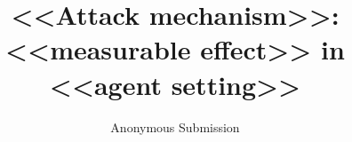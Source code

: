 \documentclass[10pt]{article}
\newif\ifanon \anontrue
\begin{document}
\title{<<Attack mechanism>>: <<measurable effect>> in <<agent setting>>}
\ifanon\author{Anonymous Submission}\else\fi
\date{}
\maketitle










\ifanon\else\section*{Acknowledgements}\fi


\appendix

\end{document}
